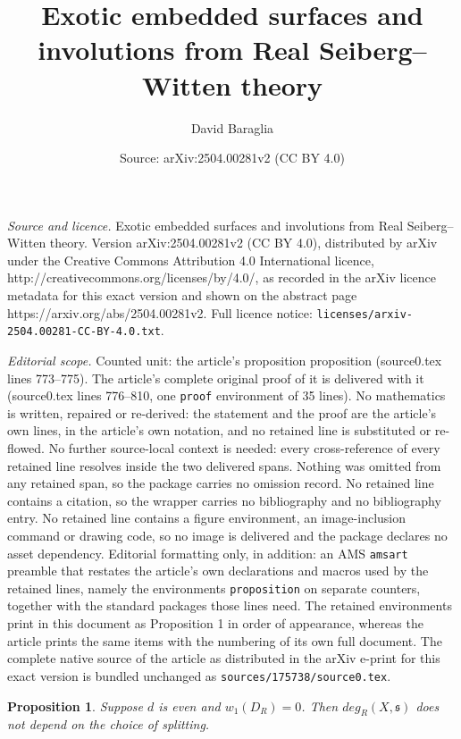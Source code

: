 \documentclass[10pt,a4paper]{amsart}
\title{Exotic embedded surfaces and involutions from Real Seiberg--Witten theory}
\author{David Baraglia}
\date{Source: arXiv:2504.00281v2 (CC BY 4.0)}
\newtheorem{proposition}{Proposition}
\begin{document}
\maketitle

\noindent\emph{Source and licence.} Exotic embedded surfaces and involutions from Real Seiberg--Witten theory. Version arXiv:2504.00281v2 (CC BY 4.0), distributed by arXiv under the Creative Commons Attribution 4.0 International licence, http://creativecommons.org/licenses/by/4.0/, as recorded in the arXiv licence metadata for this exact version and shown on the abstract page https://arxiv.org/abs/2504.00281v2. Full licence notice: \texttt{licenses/arxiv-2504.00281-CC-BY-4.0.txt}.\par\smallskip

\noindent\textit{Editorial scope.} Counted unit: the article's proposition proposition (source0.tex lines 773--775). The article's complete original proof of it is delivered with it (source0.tex lines 776--810, one \texttt{proof} environment of 35 lines). No mathematics is written, repaired or re-derived: the statement and the proof are the article's own lines, in the article's own notation, and no retained line is substituted or re-flowed.  No further source-local context is needed: every cross-reference of every retained line resolves inside the two delivered spans.  Nothing was omitted from any retained span, so the package carries no omission record.  No retained line contains a citation, so the wrapper carries no bibliography and no bibliography entry.  No retained line contains a figure environment, an image-inclusion command or drawing code, so no image is delivered and the package declares no asset dependency.  Editorial formatting only, in addition: an AMS \texttt{amsart} preamble that restates the article's own declarations and macros used by the retained lines, namely the environments \texttt{proposition} on separate counters, together with the standard packages those lines need.  The retained environments print in this document as Proposition 1 in order of appearance, whereas the article prints the same items with the numbering of its own full document.  The complete native source of the article as distributed in the arXiv e-print for this exact version is bundled unchanged as \texttt{sources/175738/source0.tex}.
\begin{proposition}
Suppose $d$ is even and $w_1(D_R) = 0$. Then $deg_R(X,\mathfrak{s})$ does not depend on the choice of splitting.
\end{proposition}
\end{document}
